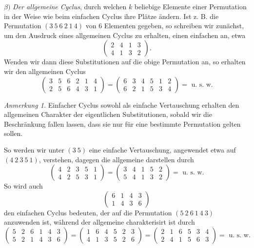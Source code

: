\documentclass[10pt]{article}
\begin{document}
\(\beta)\) \emph{Der allgemeine Cyclus}, durch welchen \(k\) beliebige Elemente einer Permutation in der Weise wie beim einfachen Cyclus ihre Plätze ändern. Ist z. B. die Permutation \((3\ 5\ 6\ 2\ 1\ 4)\) von 6 Elementen gegeben, so schreiben wir zunächst, um den Ausdruck eines allgemeinen Cyclus zu erhalten, einen einfachen an, etwa
\[
\begin{pmatrix}2&4&1&3\\4&1&3&2\end{pmatrix}.
\]
Wenden wir dann diese Substitutionen auf die obige Permutation an, so erhalten wir den allgemeinen Cyclus
\[
\begin{pmatrix}3&5&6&2&1&4\\2&5&6&4&3&1\end{pmatrix}
=
\begin{pmatrix}6&3&4&5&1&2\\6&2&1&5&3&4\end{pmatrix}
=\text{ u. s. w.}
\]

\emph{Anmerkung 1.} Einfacher Cyclus sowohl als einfache Vertauschung erhalten den allgemeinen Charakter der eigentlichen Substitutionen, sobald wir die Beschränkung fallen lassen, dass sie nur für eine bestimmte Permutation gelten sollen.

So werden wir unter \((3\ 5)\) eine einfache Vertauschung, angewendet etwa auf \((4\ 2\ 3\ 5\ 1)\), verstehen, dagegen die allgemeine darstellen durch
\[
\begin{pmatrix}4&2&3&5&1\\4&2&5&3&1\end{pmatrix}
=
\begin{pmatrix}3&4&1&5&2\\5&4&1&3&2\end{pmatrix}
=\text{ u. s. w.}
\]
So wird auch
\[
\begin{pmatrix}6&1&4&3\\1&4&3&6\end{pmatrix}
\]
den einfachen Cyclus bedeuten, der auf die Permutation \((5\ 2\ 6\ 1\ 4\ 3)\) anzuwenden ist, während der allgemeine charakterisirt ist durch
\[
\begin{pmatrix}5&2&6&1&4&3\\5&2&1&4&3&6\end{pmatrix}
=
\begin{pmatrix}1&6&4&5&2&3\\4&1&3&5&2&6\end{pmatrix}
=
\begin{pmatrix}2&1&6&5&3&4\\2&4&1&5&6&3\end{pmatrix}
=\text{ u. s. w.}
\]
\end{document}
